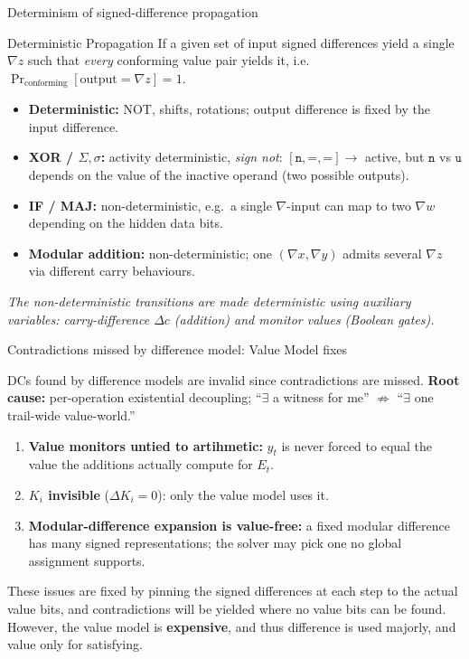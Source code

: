 \documentclass[aspectratio=169,9pt]{beamer}
\newcommand{\nn}{\texttt{n}}
\newcommand{\uu}{\texttt{u}}
\newcommand{\eq}{\texttt{=}}
\newcommand{\key}[1]{\textcolor{key}{\textbf{#1}}}
\begin{document}
\begin{frame}{Determinism of signed-difference propagation}
\begin{alertblock}{Deterministic Propagation}
If a given set of input signed differences yield a single $\nabla z$ such that \emph{every} conforming value pair yields it, i.e.\ $\Pr_{\text{conforming}}[\text{output}=\nabla z]=1$.
\end{alertblock}
\begin{itemize}
  \item \key{Deterministic:} NOT, shifts, rotations; output difference is fixed by the input difference.
  \item \key{XOR / $\Sigma,\sigma$:} activity deterministic, \emph{sign not}: $[\nn,\eq,\eq]\to$ active, but $\nn$ vs $\uu$ depends on the value of the inactive operand (two possible outputs).
  \item \key{IF / MAJ:} non-deterministic, e.g.\ a single $\nabla$-input can map to two $\nabla w$ depending on the hidden data bits.
  \item \key{Modular addition:} non-deterministic; one $(\nabla x,\nabla y)$ admits several $\nabla z$ via different carry behaviours.
\end{itemize}
\centering\emph{The non-deterministic transitions are made deterministic using auxiliary variables: carry-difference $\Delta c$ (addition) and monitor values (Boolean gates).}
\end{frame}

\begin{frame}{Contradictions missed by difference model: Value Model fixes}

DCs found by difference models are invalid since contradictions are missed.
\textbf{Root cause:} per-operation existential decoupling; ``$\exists$ a witness for me'' $\not\Rightarrow$ ``$\exists$ one trail-wide value-world.''
\begin{enumerate}
  \item \textbf{Value monitors untied to artihmetic:} $y_t$ is never forced to equal the value the additions actually compute for $E_t$. 
  \item \textbf{$K_i$ invisible} ($\Delta K_i=0$): only the value model uses it.
  \item \textbf{Modular-difference expansion is value-free:} a fixed modular difference has many signed representations; the solver may pick one no global assignment supports.
\end{enumerate}

These issues are fixed by pinning the signed differences at each step to the actual value bits, and contradictions will be yielded where no value bits can be found. However, the value model is \textbf{expensive}, and thus difference is used majorly, and value only for satisfying.

\end{frame}
\end{document}
